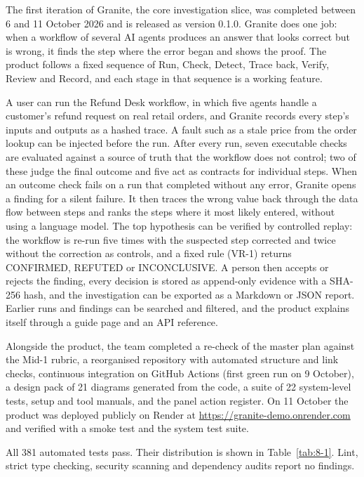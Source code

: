 \documentclass{fast-nuces-bs}
\begin{document}
The first iteration of Granite, the core investigation slice, was completed between 6 and 11 October 2026 and is released as version 0.1.0. Granite does one job: when a workflow of several AI agents produces an answer that looks correct but is wrong, it finds the step where the error began and shows the proof. The product follows a fixed sequence of Run, Check, Detect, Trace back, Verify, Review and Record, and each stage in that sequence is a working feature.

A user can run the Refund Desk workflow, in which five agents handle a customer's refund request on real retail orders, and Granite records every step's inputs and outputs as a hashed trace. A fault such as a stale price from the order lookup can be injected before the run. After every run, seven executable checks are evaluated against a source of truth that the workflow does not control; two of these judge the final outcome and five act as contracts for individual steps. When an outcome check fails on a run that completed without any error, Granite opens a finding for a silent failure. It then traces the wrong value back through the data flow between steps and ranks the steps where it most likely entered, without using a language model. The top hypothesis can be verified by controlled replay: the workflow is re-run five times with the suspected step corrected and twice without the correction as controls, and a fixed rule (VR-1) returns CONFIRMED, REFUTED or INCONCLUSIVE. A person then accepts or rejects the finding, every decision is stored as append-only evidence with a SHA-256 hash, and the investigation can be exported as a Markdown or JSON report. Earlier runs and findings can be searched and filtered, and the product explains itself through a guide page and an API reference.

Alongside the product, the team completed a re-check of the master plan against the Mid-1 rubric, a reorganised repository with automated structure and link checks, continuous integration on GitHub Actions (first green run on 9 October), a design pack of 21 diagrams generated from the code, a suite of 22 system-level tests, setup and tool manuals, and the panel action register. On 11 October the product was deployed publicly on Render at \url{https://granite-demo.onrender.com} and verified with a smoke test and the system test suite.

All 381 automated tests pass. Their distribution is shown in Table~\ref{tab:8-1}. Lint, strict type checking, security scanning and dependency audits report no findings.
\end{document}
